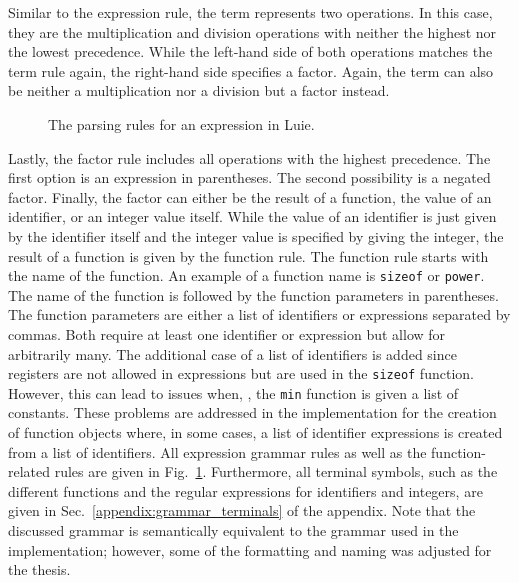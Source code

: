 Similar to the expression rule, the term represents two operations. In this case, they are the multiplication and division operations with neither the highest nor the lowest precedence. While the left-hand side of both operations matches the term rule again, the right-hand side specifies a factor. Again, the term can also be neither a multiplication nor a division but a factor instead.

\begin{figure}[htp]
    \centering
    
    \caption{The parsing rules for an expression in Luie.}
    \label{fig:implementation_expression}
\end{figure}

Lastly, the factor rule includes all operations with the highest precedence. The first option is an expression in parentheses. 
The second possibility is a negated factor. Finally, the factor can either be the result of a function, the value of an identifier, or an integer value itself. While the value of an identifier is just given by the identifier itself and the integer value is specified by giving the integer, the result of a function is given by the function rule. The function rule starts with the name of the function. An example of a function name is \texttt{sizeof} or \texttt{power}. The name of the function is followed by the function parameters in parentheses. The function parameters are either a list of identifiers or expressions separated by commas. Both require at least one identifier or expression but allow for arbitrarily many.
The additional case of a list of identifiers is added since registers are not allowed in expressions but are used in the \texttt{sizeof} function. However, this can lead to issues when, \eg, the \texttt{min} function is given a list of constants. These problems are addressed in the implementation for the creation of function objects where, in some cases, a list of identifier expressions is created from a list of identifiers.
All expression grammar rules as well as the function-related rules are given in Fig.~\ref{fig:implementation_expression}. Furthermore, all terminal symbols, such as the different functions and the regular expressions for identifiers and integers, are given in Sec.~\ref{appendix:grammar_terminals} of the appendix.
Note that the discussed grammar is semantically equivalent to the grammar used in the implementation; however, some of the formatting and naming was adjusted for the thesis. 

